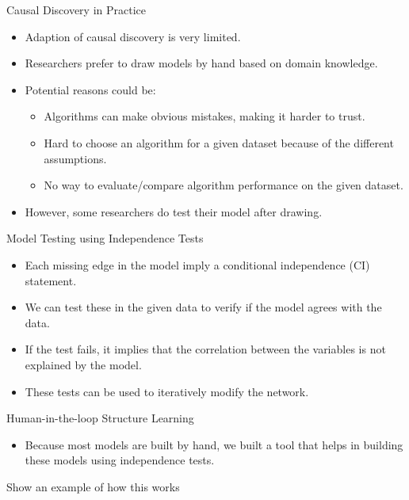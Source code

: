 \documentclass{beamer}
\begin{document}
\begin{frame}{Causal Discovery in Practice}
	\begin{itemize}
		\item Adaption of causal discovery is very limited.
		\item Researchers prefer to draw models by hand based on domain knowledge.
		\item Potential reasons could be:
			\begin{itemize}
				\item Algorithms can make obvious mistakes, making it harder to trust.
				\item Hard to choose an algorithm for a given dataset because of the different assumptions.
				\item No way to evaluate/compare algorithm performance on the given dataset.
			\end{itemize}
		\item However, some researchers do test their model after drawing.
	\end{itemize}
\end{frame}

\begin{frame}{Model Testing using Independence Tests}

	\begin{itemize}
		\item Each missing edge in the model imply a conditional independence (CI) statement. 
		\item We can test these in the given data to verify if the model agrees with the data.
		\item If the test fails, it implies that the correlation between the variables is not explained by the model.
		\item These tests can be used to iteratively modify the network.
	\end{itemize}
\end{frame}

\begin{frame}{Human-in-the-loop Structure Learning}
	\begin{itemize}
		\item Because most models are built by hand, we built a tool that helps in building these models using independence tests.
	\end{itemize}
\end{frame}

\begin{frame}{Show an example of how this works}
\end{frame}
\end{document}
